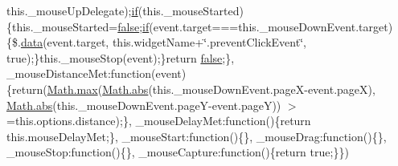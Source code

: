 \begin{DoxyCompactItemize}
this.\+\_\+mouse\+Up\+Delegate);\hyperlink{fullpage_2plugin_8js_a8b98017e64ef036adb9ae327ff94abe1}{if}(this.\+\_\+mouse\+Started)\{this.\+\_\+mouse\+Started=\hyperlink{validate_8js_a5df37b7f02e5cdc7d9412b7f872b8e01}{false};\hyperlink{fullpage_2plugin_8js_a8b98017e64ef036adb9ae327ff94abe1}{if}(event.\+target===this.\+\_\+mouse\+Down\+Event.\+target)\{\$.\hyperlink{fullpage_2plugin_8js_a718c1bf5a3bf21ebb980203b142e5b75}{data}(event.\+target, this.\+widget\+Name+\char`\"{}.prevent\+Click\+Event\char`\"{}, true);\}this.\+\_\+mouse\+Stop(event);\}return \hyperlink{validate_8js_a5df37b7f02e5cdc7d9412b7f872b8e01}{false};\}, \+\_\+mouse\+Distance\+Met\+:function(event)\{return(\hyperlink{jquery_8knob_8js_a04fa2ea575d5471ca09e1b344ec4a69e}{Math.\+max}(\hyperlink{jquery-ui_8js_a060a92b4c8a76e38270ccd8adc1e36d7}{Math.\+abs}(this.\+\_\+mouse\+Down\+Event.\+page\+X-\/event.\+page\+X), \hyperlink{jquery-ui_8js_a060a92b4c8a76e38270ccd8adc1e36d7}{Math.\+abs}(this.\+\_\+mouse\+Down\+Event.\+page\+Y-\/event.\+page\+Y)) $>$=this.\+options.\+distance);\}, \+\_\+mouse\+Delay\+Met\+:function()\{return this.\+mouse\+Delay\+Met;\}, \+\_\+mouse\+Start\+:function()\{\}, \+\_\+mouse\+Drag\+:function()\{\}, \+\_\+mouse\+Stop\+:function()\{\}, \+\_\+mouse\+Capture\+:function()\{return true;\}\})
\item 
$$
\end{DoxyCompactItemize}
